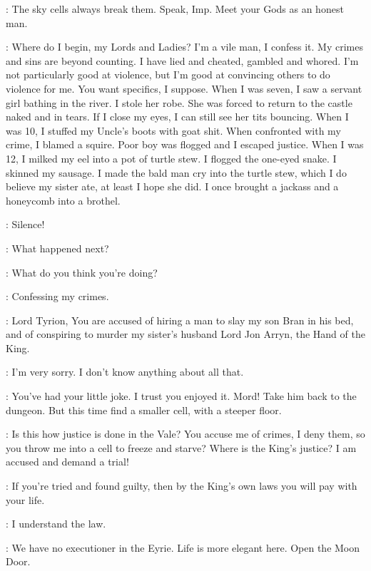 \LYSA: The sky cells always break them. Speak, Imp. Meet your Gods as an honest man. 

\TYRION: Where do I begin, my Lords and Ladies? I'm a vile man, I
confess it. My crimes and sins are beyond counting. I have lied and
cheated, gambled and whored. I'm not particularly good at violence,
but I'm good at convincing others to do violence for me. You want
specifics, I suppose. When I was seven, I saw a servant girl bathing
in the river. I stole her robe. She was forced to return to the castle
naked and in tears. If I close my eyes, I can still see her tits
bouncing. When I was 10, I stuffed my Uncle's boots with goat
shit. When confronted with my crime, I blamed a squire. Poor boy was
flogged and I escaped justice. When I was 12, I milked my eel into a
pot of turtle stew. I flogged the one-eyed snake. I skinned my
sausage. I made the bald man cry into the turtle stew, which I do
believe my sister ate, at least I hope she did. I once brought a
jackass and a honeycomb into a brothel.

\LYSA: Silence! 

\ROBYN: What happened next? 

\LYSA: What do you think you're doing? 

\TYRION: Confessing my crimes. 

\CATELYN: Lord Tyrion, You are accused of hiring a man to slay my son Bran in his bed, and of conspiring to murder my sister's husband Lord Jon Arryn, the Hand of the King. 

\TYRION: I'm very sorry. I don't know anything about all that. 

\LYSA: You've had your little joke. I trust you enjoyed it. Mord! Take him back to the dungeon. But this time find a smaller cell, with a steeper floor. 

\TYRION: Is this how justice is done in the Vale? You accuse me of crimes, I deny them, so you throw me into a cell to freeze and starve? Where is the King's justice? I am accused and demand a trial! 

\LYSA: If you're tried and found guilty, then by the King's own laws you will pay with your life. 

\TYRION: I understand the law. 

\LYSA: We have no executioner in the Eyrie. Life is more elegant here. Open the Moon Door. 


